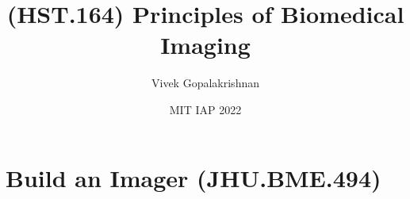 \documentclass[letter,twoside,openany]{tufte-book}
\title{(HST.164) Principles of Biomedical Imaging}
\author{Vivek Gopalakrishnan}
\date{MIT IAP 2022}
\begin{document}
\maketitle
\tableofcontents
\newpage



\part{Build an Imager (JHU.BME.494)}

\end{document}
